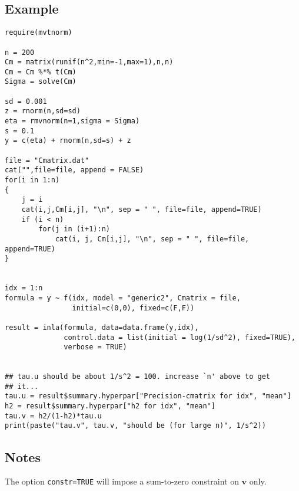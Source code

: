 \documentclass[a4paper,11pt]{article}
\def\mm#1{\ensuremath{\boldsymbol{#1}}} %
\begin{document}
\subsection*{Example}
{\small\begin{verbatim}
require(mvtnorm)

n = 200
Cm = matrix(runif(n^2,min=-1,max=1),n,n)
Cm = Cm %*% t(Cm)
Sigma = solve(Cm)

sd = 0.001
z = rnorm(n,sd=sd)
eta = rmvnorm(n=1,sigma = Sigma)
s = 0.1
y = c(eta) + rnorm(n,sd=s) + z

file = "Cmatrix.dat"
cat("",file=file, append = FALSE)
for(i in 1:n)
{
    j = i
    cat(i,j,Cm[i,j], "\n", sep = " ", file=file, append=TRUE)
    if (i < n)
        for(j in (i+1):n)
            cat(i, j, Cm[i,j], "\n", sep = " ", file=file, append=TRUE)
}


idx = 1:n
formula = y ~ f(idx, model = "generic2", Cmatrix = file,
                initial=c(0,0), fixed=c(F,F))

result = inla(formula, data=data.frame(y,idx),
              control.data = list(initial = log(1/sd^2), fixed=TRUE),
              verbose = TRUE)


## tau.u should be about 1/s^2 = 100. increase `n' above to get
## it...
tau.u = result$summary.hyperpar["Precision-cmatrix for idx", "mean"]
h2 = result$summary.hyperpar["h2 for idx", "mean"]
tau.v = h2/(1-h2)*tau.u
print(paste("tau.v", tau.v, "should be (for large n)", 1/s^2))
\end{verbatim}}

\subsection*{Notes}

The option \texttt{constr=TRUE} will impose a sum-to-zero constraint
on $\mm{v}$ only.
\end{document}
